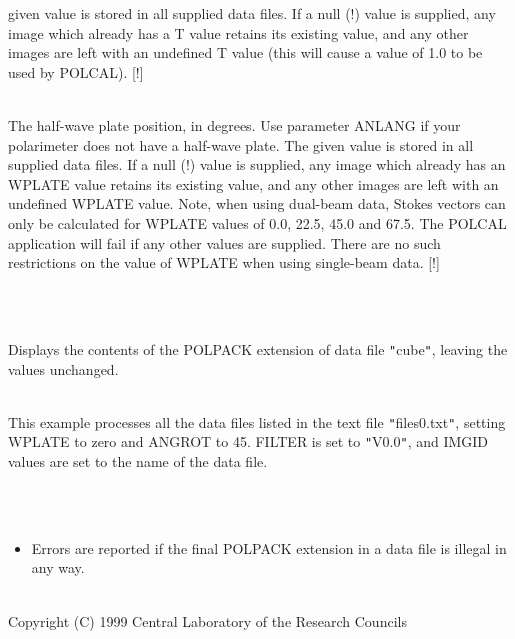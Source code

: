 \documentclass[twoside,11pt]{article}
\newcommand{\htmlref}[2]{#1}
\renewcommand{\_}{\texttt{\symbol{95}}}
\newlength{\sstexampleslength}
\newcommand{\sstexamples}[1]{
   \item[Examples:] \mbox{} \\
   \vspace{-3.5ex}
   \begin{description}
      #1
   \end{description}
}
\newcommand{\sstsubsection}[1]{ \item[{#1}] \mbox{} \\}
\newcommand{\sstexamplesubsection}[2]{\sloppy
\item[\parbox{\sstexampleslength}{\ssttt #1}] \mbox{} \vspace{1.0ex}
\\ #2 }
\newcommand{\sstnotes}[1]{\item[Notes:] \mbox{} \\[1.3ex] #1}
\newcommand{\sstdiytopic}[2]{\item[{\hspace{-0.35em}#1\hspace{-0.35em}:}]
\mbox{} \\[1.3ex] #2}
\newcommand{\sstitemlist}[1]{
  \mbox{} \\
  \vspace{-3.5ex}
  \begin{itemize}
     #1
  \end{itemize}
}
\newcommand{\sstitem}{\item}
\newcommand{\sstexamples}[1]{
      \item[Examples:] \\
      \begin{description}
         #1
      \end{description}
      \\
   }
\newcommand{\sstsubsection}[1]{\item[{#1}]}
\newcommand{\sstexamplesubsection}[2]{\item[{\ssttt #1}] #2}
\newcommand{\sstnotes}[1]{\item[Notes:] #1 }
\newcommand{\sstdiytopic}[2]{\item[{#1}] #2 }
\newcommand{\sstitemlist}[1]{
      \begin{itemize}
         #1
      \end{itemize}
      \\
   }
\newcommand{\sstitem}{\item}
\begin{document}
{{{         given value is stored in all supplied data files. If a null (!)
         value is supplied, any image which already has a T value retains
         its existing value, and any other images are left with an
         undefined T value (this will cause a value of 1.0 to be used by
         \htmlref{POLCAL}{POLCAL}). [!]
      }
      \sstsubsection{
         WPLATE = \_REAL (Read)
      }{
         The half-wave plate position, in degrees. Use parameter ANLANG if
         your polarimeter does not have a half-wave plate. The given value
         is stored in all supplied data files. If a null (!) value is
         supplied, any image which already has an WPLATE value retains its
         existing value, and any other images are left with an undefined
         WPLATE value. Note, when using dual-beam data, Stokes vectors can
         only be calculated for WPLATE values of 0.0, 22.5, 45.0 and 67.5.
         The \htmlref{POLCAL}{POLCAL} application will fail if any other values are
         supplied. There are no such restrictions on the value of WPLATE
         when using single-beam data. [!]
      }
   }
   \sstexamples{
      \sstexamplesubsection{
         polext in=cube
      }{
         Displays the contents of the POLPACK extension of data file
         {\tt "}cube{\tt "}, leaving the values unchanged.
      }
      \sstexamplesubsection{
         polext in=$\wedge$files\_0.txt wplate=0 filter=V angrot=45
      }{
         This example processes all the data files listed in the text file
         {\tt "}files\_0.txt{\tt "}, setting WPLATE to zero and ANGROT to 45. FILTER
         is set to {\tt "}V\_0.0{\tt "}, and IMGID values are set to the name of the data
         file.
      }
   }
   \sstnotes{
      \sstitemlist{

         \sstitem
         Errors are reported if the final POLPACK extension in a data file
         is illegal in any way.
      }
   }
   \sstdiytopic{
      Copyright
   }{
      Copyright (C) 1999 Central Laboratory of the Research Councils
   }
}
\end{document}
